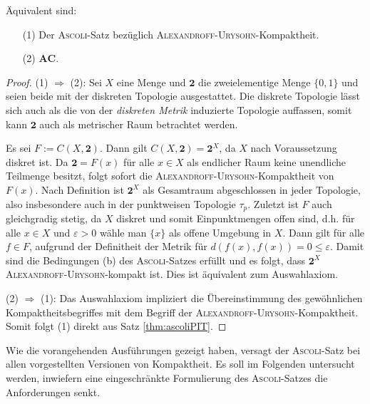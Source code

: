 \begin{thm}
  Äquivalent sind:
  \begin{enumerate}
    \item[(1)] Der \textsc{Ascoli}-Satz bezüglich \textsc{Alexandroff}-\textsc{Urysohn}-Kompaktheit.
    \item[(2)] $\mathbf{AC}$.
  \end{enumerate}
\end{thm}

\begin{proof}
  (1) $\Rightarrow$ (2): Sei $X$ eine Menge und $\mathbf{2}$ die zweielementige Menge $\{0,1\}$ und seien beide mit der diskreten Topologie ausgestattet. 
  Die diskrete Topologie lässt sich auch als die von der \textit{diskreten Metrik} induzierte Topologie auffassen, somit kann $\mathbf{2}$ auch als metrischer Raum betrachtet werden. 

  Es sei $F := C(X, \mathbf{2})$.
  Dann gilt $C(X, \mathbf{2}) = \mathbf{2}^X$, da $X$ nach Voraussetzung diskret ist.
  Da $\mathbf{2} = F(x)$ für alle $x \in X$ als endlicher Raum keine unendliche Teilmenge besitzt, folgt sofort die \textsc{Alexandroff}-\textsc{Urysohn}-Kompaktheit von $F(x)$.
  Nach Definition ist $\mathbf{2}^X$ als Gesamtraum abgeschlossen in jeder Topologie, also insbesondere auch in der punktweisen Topologie $\tau_p$.
  Zuletzt ist $F$ auch gleichgradig stetig, da $X$ diskret und somit Einpunktmengen offen sind, d.h. für alle $x \in X$ und $\varepsilon > 0$ wähle man $\{x\}$ als offene Umgebung in $X$. Dann gilt für alle $f \in F$, aufgrund der Definitheit der Metrik für  $d(f(x),f(x)) = 0 \leq \varepsilon$.
  Damit sind die Bedingungen (b) des \textsc{Ascoli}-Satzes erfüllt und es folgt, dass $\mathbf{2}^X$ \textsc{Alexandroff}-\textsc{Urysohn}-kompakt ist. Dies ist äquivalent zum Auswahlaxiom.

  (2) $\Rightarrow$ (1): Das Auswahlaxiom impliziert die Übereinstimmung des gewöhnlichen Kompaktheitsbegriffes mit dem Begriff der \textsc{Alexandroff}-\textsc{Urysohn}-Kompaktheit. Somit folgt (1) direkt aus Satz \ref{thm:ascoliPIT}.
\end{proof}

Wie die vorangehenden Ausführungen gezeigt haben, versagt der \textsc{Ascoli}-Satz bei allen vorgestellten Versionen von Kompaktheit. Es soll im Folgenden untersucht werden, inwiefern eine eingeschränkte Formulierung des \textsc{Ascoli}-Satzes die Anforderungen senkt.

